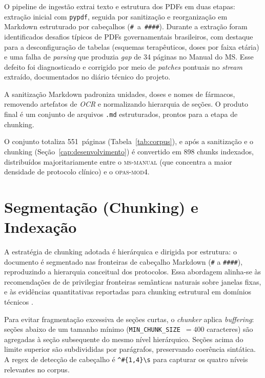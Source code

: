 \documentclass[
  12pt,
  oneside,
  a4paper,
  english,
  brazil
]{abntex2}
\begin{document}
O pipeline de ingestão extrai texto e estrutura dos PDFs em duas etapas:
extração inicial com \texttt{pypdf}, seguida por sanitização e reorganização em
Markdown estruturado por cabeçalhos (\texttt{\#}~a~\texttt{\#\#\#\#}). Durante a
extração foram identificados desafios típicos de PDFs governamentais
brasileiros, com destaque para a desconfiguração de tabelas (esquemas
terapêuticos, doses por faixa etária) e uma falha de \textit{parsing} que produzia
\textit{gap} de 34 páginas no Manual do MS. Esse defeito foi diagnosticado e
corrigido por meio de \textit{patches} pontuais no \textit{stream} extraído,
documentados no diário técnico do projeto.

A sanitização Markdown padroniza unidades, doses e nomes de fármacos, removendo
artefatos de \textit{OCR} e normalizando hierarquia de seções. O produto final
é um conjunto de arquivos \texttt{.md} estruturados, prontos para a etapa de
chunking.

O conjunto totaliza 551~páginas (Tabela~\ref{tab:corpus}), e após a sanitização
e o chunking (Seção~\ref{cap:desenvolvimento}) é convertido em 898
chunks indexados, distribuídos majoritariamente entre o
\textsc{ms-manual} (que concentra a maior densidade de protocolo clínico) e o
\textsc{opas-mod4}.

\section{Segmentação (Chunking) e Indexação}

A estratégia de chunking adotada é hierárquica e dirigida por estrutura:
o documento é segmentado nas fronteiras de cabeçalho Markdown
(\texttt{\#} a \texttt{\#\#\#\#}), reproduzindo a hierarquia conceitual dos
protocolos. Essa abordagem alinha-se às recomendações de \citeauthor{gao2024}
\cite{gao2024} de privilegiar fronteiras semânticas naturais sobre janelas fixas,
e às evidências quantitativas reportadas para chunking estrutural em
domínios técnicos \cite{advancedChunkingRAG2025}.

Para evitar fragmentação excessiva de seções curtas, o \textit{chunker} aplica
\textit{buffering}: seções abaixo de um tamanho mínimo
(\texttt{MIN\_CHUNK\_SIZE}~$=400$ caracteres) são agregadas à seção subsequente do
mesmo nível hierárquico. Seções acima do limite superior são subdivididas por
parágrafos, preservando coerência sintática. A regex de detecção de cabeçalho é
\texttt{\textasciicircum\#\{1,4\}\textbackslash s} para capturar os quatro níveis
relevantes no corpus.
\end{document}
